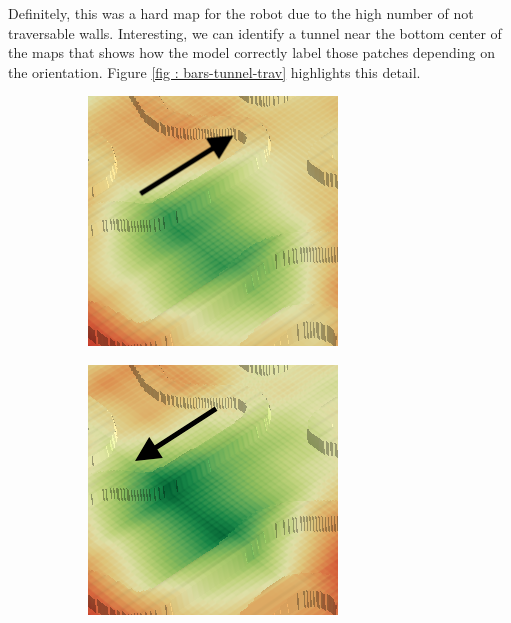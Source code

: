 \documentclass[../document.tex]{subfiles}
\begin{document}
Definitely, this was a hard map for the robot due to the high number of not traversable walls. Interesting, we can identify a tunnel near the bottom center of the maps that shows how the model correctly label those patches depending on the orientation. Figure \ref{fig : bars-tunnel-trav} highlights this detail.

\begin{figure} [htbp]
  \centering
  \begin{subfigure}[b]{0.23\textwidth}
    \includegraphics[width=\linewidth]{../img/4/traversability/bars/tunnel/-270-crop.png} 
  \end{subfigure}
  \begin{subfigure}[b]{0.23\textwidth}
      \includegraphics[width=\linewidth]{../img/4/traversability/bars/tunnel/-90-crop.png}

\end{subfigure}
\end{figure}
\end{document}
